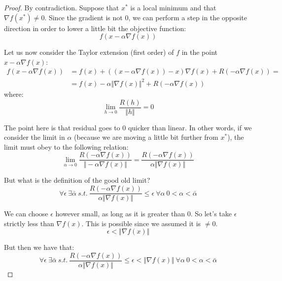 \begin{proof}
By contradiction. Suppose that $x^*$ is a local minimum and that $\nabla f(x^*) \neq 0$. Since the gradient is not 0, we can perform a step in the opposite direction in order to lower a little bit the objective function:
\begin{equation}
    f(x-\alpha\nabla f(x))
\end{equation}
\par Let us now consider the Taylor extension (first order) of $f$ in the point $x-\alpha\nabla f(x)$:
\begin{equation}
\begin{split}
    f(x-\alpha\nabla f(x)) &= f(x) + ((x - \alpha\nabla f(x)) - x)\nabla f(x) + R(-\alpha\nabla f(x)) =\\
    &= f(x) - \alpha \Vert \nabla f(x) \Vert^2 + R(-\alpha\nabla f(x))
\end{split}
\end{equation}
where:
\begin{equation}
    \lim_{h \rightarrow 0} \frac{R(h)}{\Vert h \Vert} = 0
\end{equation}
\par The point here is that residual goes to 0 quicker than linear. In other words, if we consider the limit in $\alpha$ (because we are moving a little bit further from $x^*$), the limit must obey to the following relation:
\begin{equation}
    \lim_{\alpha \rightarrow 0} \frac{R(-\alpha\nabla f(x))}{\Vert -\alpha\nabla f(x) \Vert} = \frac{R(-\alpha\nabla f(x))}{\alpha\Vert \nabla f(x) \Vert}
\end{equation}
\par But what is the definition of the good old limit?
\begin{equation}
    \forall\epsilon\ \exists\bar{\alpha}\ s.t.\ \frac{R(-\alpha\nabla f(x))}{\alpha\Vert \nabla f(x) \Vert} \leq \epsilon\ \forall \alpha\ 0 < \alpha < \bar{\alpha}
\end{equation}
\par We can choose $\epsilon$ however small, as long as it is greater than 0. So let's take $\epsilon$ strictly less than $\nabla f(x)$. This is possible since we assumed it is $\neq 0$.
\begin{equation}
    \epsilon < \Vert \nabla f(x) \Vert 
\end{equation}
\par But then we have that:
\begin{equation}
    \forall\epsilon\ \exists\bar{\alpha}\ s.t.\ \frac{R(-\alpha\nabla f(x))}{\alpha\Vert \nabla f(x) \Vert} \leq \epsilon < \Vert \nabla f(x) \Vert\ \forall \alpha\ 0 < \alpha < \bar{\alpha}

\end{equation}
\end{proof}
